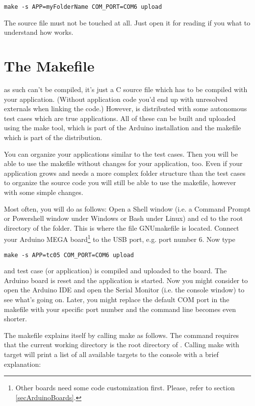 \verb+make -s APP=myFolderName COM_PORT=COM6 upload+

The \rtos{} source file  must not be touched at all. Just open
it for reading if you what to understand how \rtos{} works.


\section{The Makefile}
\label{secMakefile}

\rtos{} as such can't be compiled, it's just a C source file which has to
be compiled with your application. (Without application code you'd end up
with unresolved externals when linking the code.) However, \rtos{} is
distributed with some autonomous test cases which are true \rtos{}
applications. All of these can be built and uploaded using the make tool,
which is part of the Arduino installation and the makefile which is part
of the \rtos{} distribution.

You can organize your applications similar to the test cases. Then you
will be able to use the makefile without changes for your application,
too. Even if your application grows and needs a more complex folder
structure than the test cases to organize the source code you will still
be able to use the makefile, however with some simple changes.

Most often, you will do as follows: Open a Shell window (i.e. a Command
Prompt or Powershell window under Windows or Bash under Linux) and cd to
the root directory of the \rtos{} folder. This is where the file
GNUmakefile is located. Connect your Arduino MEGA board\footnote{Other
boards need some code customization first. Please, refer to section
\ref{secArduinoBoards}.} to the USB port, e.g. port number 6. Now type

\verb+make -s APP=tc05 COM_PORT=COM6 upload+

and test case (or application)  is compiled and uploaded
to the board. The Arduino board is reset and the \rtos{} application is
started. Now you might consider to open the Arduino IDE and open the
Serial Monitor (i.e. the console window) to see what's going on. Later,
you might replace the default COM port in the makefile with your specific
port number and the command line becomes even shorter.

The makefile explains itself by calling make as follows. The command
requires that the current working directory is the root directory of
\rtos{}. Calling make with target  will print a list of all
available targets to the console with a brief explanation:

